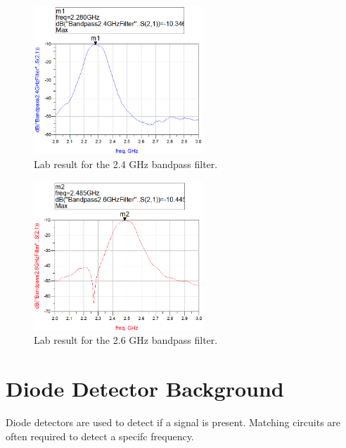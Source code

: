 \documentclass[conference]{IEEEtran}
\begin{document}
\begin{figure}[!htb]
\centering
\includegraphics[width=2.5in]{bandpass-pics/bpf24.png}
\caption{Lab result for the 2.4 GHz bandpass filter.}
\label{fig:bpf24}
\end{figure}

\begin{figure}[!htb]
\centering
\includegraphics[width=2.5in]{bandpass-pics/bpf26.png}
\caption{Lab result for the 2.6 GHz bandpass filter.}
\label{fig:bpf26}
\end{figure}

\section{Diode Detector Background}
Diode detectors are used to detect if a signal is present.  Matching circuits are often required to detect a specifc frequency.
\end{document}
